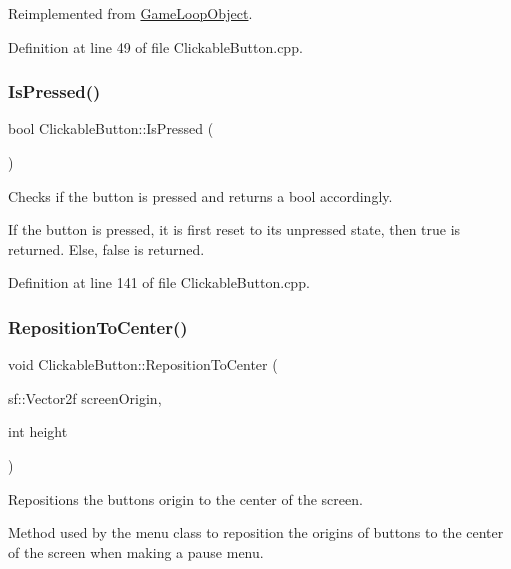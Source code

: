 Reimplemented from \hyperlink{class_game_loop_object_aecab111d504b7f4590045ca7c83a36de}{Game\+Loop\+Object}.



Definition at line 49 of file Clickable\+Button.\+cpp.

\mbox{\label{class_clickable_button_aa63eaa88bbfaf717e46b5ab4cfa6d12c}} 
\subsubsection{\texorpdfstring{Is\+Pressed()}{IsPressed()}}
{\footnotesize\ttfamily bool Clickable\+Button\+::\+Is\+Pressed (\begin{DoxyParamCaption}{ }\end{DoxyParamCaption})}



Checks if the button is pressed and returns a bool accordingly. 

If the button is pressed, it is first reset to its unpressed state, then \textquotesingle{}true\textquotesingle{} is returned. Else, false is returned. 

Definition at line 141 of file Clickable\+Button.\+cpp.

\mbox{\label{class_clickable_button_ae96a7ed06c7eb63b37eefeb45407426e}} 
\subsubsection{\texorpdfstring{Reposition\+To\+Center()}{RepositionToCenter()}}
{\footnotesize\ttfamily void Clickable\+Button\+::\+Reposition\+To\+Center (\begin{DoxyParamCaption}\item[{sf\+::\+Vector2f}]{screen\+Origin,  }\item[{int}]{height }\end{DoxyParamCaption})}



Repositions the button\textquotesingle{}s origin to the center of the screen. 

Method used by the menu class to reposition the origins of buttons to the center of the screen when making a pause menu. 

